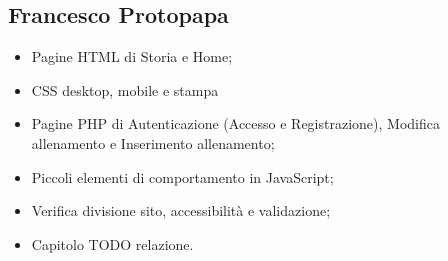 \documentclass[a4paper]{article}
\begin{document}
	\subsection{Francesco Protopapa}
	\begin{itemize}
		\item Pagine HTML di Storia e Home;
		\item CSS desktop, mobile e stampa
		\item Pagine PHP di Autenticazione (Accesso e Registrazione), Modifica allenamento e Inserimento allenamento;
		\item Piccoli elementi di comportamento in JavaScript;
		\item Verifica divisione sito, accessibilità e validazione;
		\item Capitolo TODO relazione.        
	\end{itemize}
\end{document}
